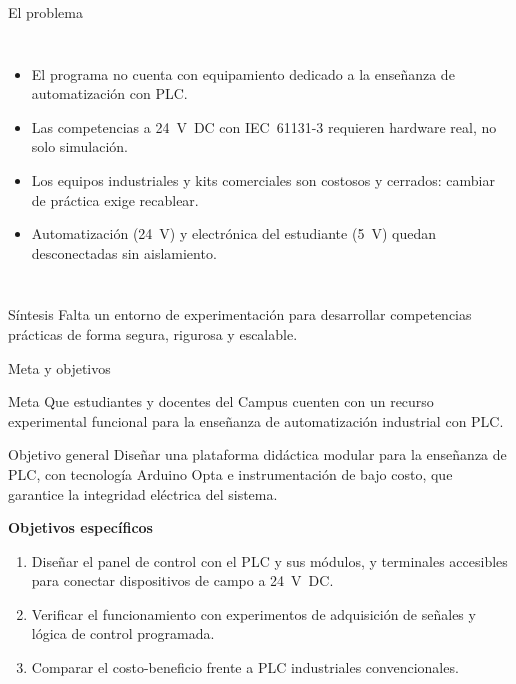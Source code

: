 \documentclass[aspectratio=169,11pt]{beamer}
\begin{document}
\begin{frame}{El problema}
    \begin{columns}[T]
        \begin{itemize}
            \item El programa no cuenta con equipamiento dedicado a la enseñanza de automatización con PLC.
            \item Las competencias a 24~V~DC con IEC~61131-3 requieren hardware real, no solo simulación.
            \item Los equipos industriales y kits comerciales son costosos y cerrados: cambiar de práctica exige recablear.
            \item Automatización (24~V) y electrónica del estudiante (5~V) quedan desconectadas sin aislamiento.
        \end{itemize}
    \end{columns}
    \vspace{0.3cm}
    \begin{block}{Síntesis}
        Falta un entorno de experimentación para desarrollar competencias prácticas de forma segura, rigurosa y escalable.
    \end{block}
\end{frame}

\begin{frame}{Meta y objetivos}
    \begin{block}{Meta}
        Que estudiantes y docentes del Campus cuenten con un recurso experimental funcional para la enseñanza de automatización industrial con PLC.
    \end{block}
    \begin{block}{Objetivo general}
        Diseñar una plataforma didáctica modular para la enseñanza de PLC, con tecnología Arduino Opta e instrumentación de bajo costo, que garantice la integridad eléctrica del sistema.
    \end{block}
    \textbf{Objetivos específicos}
    \begin{enumerate}
        \item Diseñar el panel de control con el PLC y sus módulos, y terminales accesibles para conectar dispositivos de campo a 24~V~DC.
        \item Verificar el funcionamiento con experimentos de adquisición de señales y lógica de control programada.
        \item Comparar el costo-beneficio frente a PLC industriales convencionales.
    \end{enumerate}
\end{frame}
\end{document}
